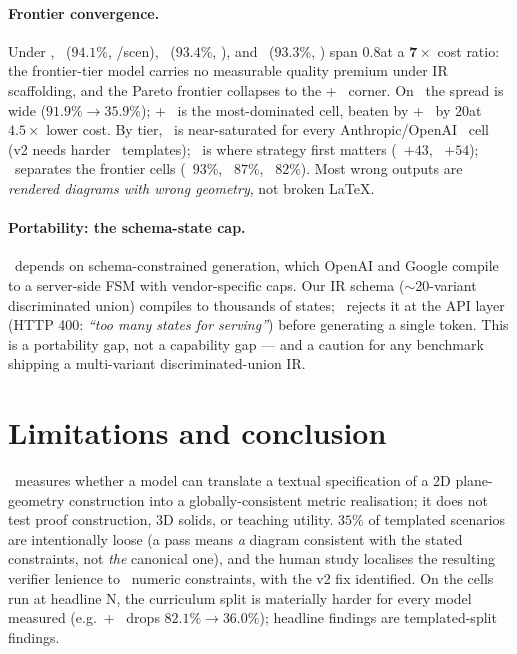 \documentclass{article}
\begin{document}
\paragraph{Frontier convergence.}
Under \structured, \gpt\ ($94.1\%$, /scen), \sonnet\ ($93.4\%$, ), and \opus\ ($93.3\%$, ) span $0.8$\pp at a $\mathbf{7\times}$ cost ratio: the frontier-tier model carries no measurable quality premium under IR scaffolding, and the Pareto frontier collapses to the \gpt + \structured\ corner.
On \rawcode\ the spread is wide ($91.9\% \to 35.9\%$); \opus + \rawcode\ is the most-dominated cell, beaten by \gpt + \rawcode\ by $20$\pp at $4.5\times$ lower cost.
By tier, \tone\ is near-saturated for every Anthropic/OpenAI \structured\ cell (v2 needs harder \tone\ templates); \ttwo\ is where strategy first matters (\opus\ $+43$\pp, \geminipro\ $+54$\pp); \tthree\ separates the frontier cells (\gpt\ $93\%$, \sonnet\ $87\%$, \opus\ $82\%$).
Most wrong outputs are \emph{rendered diagrams with wrong geometry}, not broken LaTeX.

\paragraph{Portability: the schema-state cap.}
\structured\ depends on schema-constrained generation, which OpenAI and Google compile to a server-side FSM with vendor-specific caps.
Our IR schema ($\sim$20-variant discriminated union) compiles to thousands of states; \geminiflash\ rejects it at the API layer (HTTP 400: \emph{``too many states for serving''}) before generating a single token.
This is a portability gap, not a capability gap --- and a caution for any benchmark shipping a multi-variant discriminated-union IR.

\section{Limitations and conclusion}
\label{sec:discussion}

\GeoGenBench\ measures whether a model can translate a textual specification of a 2D plane-geometry construction into a globally-consistent metric realisation; it does not test proof construction, 3D solids, or teaching utility.
$35\%$ of templated scenarios are intentionally loose (a pass means \emph{a} diagram consistent with the stated constraints, not \emph{the} canonical one), and the human study localises the resulting verifier lenience to \ttwo\ numeric constraints, with the v2 fix identified.
On the cells run at headline N, the curriculum split is materially harder for every model measured (e.g.\ \haiku + \rawcode\ drops $82.1\% \to 36.0\%$); headline findings are templated-split findings.
\end{document}
